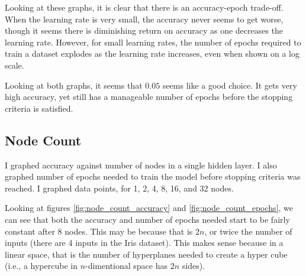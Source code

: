 \documentclass[12pt]{article}
\begin{document}
Looking at these graphs, it is clear that there is an accuracy-epoch trade-off.
When the learning rate is very small, the accuracy never seems to get worse,
though it seems there is diminishing return on accuracy as one decreases the
learning rate. However, for small learning rates, the number of epochs required
to train a dataset explodes as the learning rate increases, even when shown on
a log scale.

Looking at both graphs, it seems that $0.05$  seems like a good choice. It gets
very high accuracy, yet still has a manageable number of epochs before the
stopping criteria is satisfied.
\subsection{Node Count}
I graphed accuracy against number of nodes in a single hidden layer. I also
graphed number of epochs needed to train the model before stopping
criteria was reached. I graphed data points, for 1, 2, 4, 8, 16, and 32 nodes.

Looking at figures \ref{fig:node_count_accuracy} and
\ref{fig:node_count_epochs}, we can see that both the accuracy and number
of epochs needed start to be fairly constant after $8$ nodes. This may be
because that is $2n$, or twice the number of inputs (there are 4 inputs in the
Iris dataset). This makes sense because in a linear space, that is the number
of hyperplanes needed to create a hyper cube (i.e., a hypercube in
$n$-dimentional space has $2n$ sides).
\end{document}
